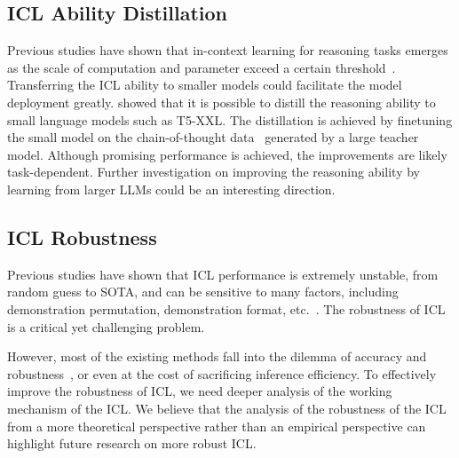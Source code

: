 \subsection{ICL Ability Distillation}
Previous studies have shown that in-context learning for reasoning tasks emerges as the scale of computation and parameter exceed a certain threshold~\citep{wei2022emergent}. Transferring the ICL ability to smaller models could facilitate the model deployment greatly.
\citet{distill2smallmodel} showed that it is possible to distill the reasoning ability to small language models such as T5-XXL. The distillation is achieved by finetuning the small model on the chain-of-thought data~\citep{cot} generated by a large teacher model. 
Although promising performance is achieved, %
the improvements are likely task-dependent.
Further investigation on improving the reasoning ability by learning from larger LLMs could be an interesting direction.
\subsection{ICL Robustness}
Previous studies have shown that ICL performance is extremely unstable, from random guess to SOTA, and can be sensitive to many factors, including demonstration permutation, demonstration format, etc.~\citep{calibrate, lu2022order}. 
The robustness of ICL is a critical yet challenging problem. 

However, most of the existing methods fall into the dilemma of accuracy and robustness~\cite{chen2022sensitivity}, or even at the cost of sacrificing inference efficiency. To effectively improve the robustness of ICL, we need deeper analysis of the working mechanism of the ICL. We believe that the analysis of the robustness of the ICL from a more theoretical perspective rather than an empirical perspective can highlight future research on more robust ICL.

